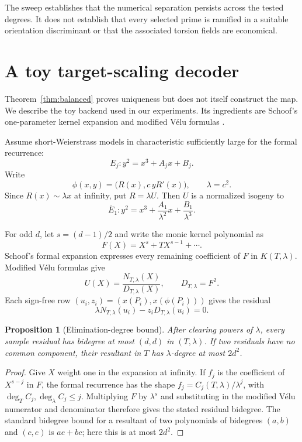 \documentclass[11pt]{article}
\newtheorem{proposition}[theorem]{Proposition}
\begin{document}
The sweep establishes that the numerical separation persists across the
tested degrees.  It does not establish that every selected prime is ramified
in a suitable orientation discriminant or that the associated torsion fields
are economical.

\section{A toy target-scaling decoder}

Theorem~\ref{thm:balanced} proves uniqueness but does not itself construct the
map.  We describe the toy backend used in our experiments.  Its ingredients
are Schoof's one-parameter kernel expansion and modified V\'elu formulas
\cite{schoof-counting,bmss,takahashi-kernel,velu}.

Assume short-Weierstrass models in characteristic sufficiently large for the
formal recurrence:
\[
 E_j:y^2=x^3+A_jx+B_j.
\]
Write
\[
 \phi(x,y)=\bigl(R(x),c\,yR'(x)\bigr),\qquad \lambda=c^2.
\]
Since $R(x)\sim\lambda x$ at infinity, put $R=\lambda U$.  Then $U$ is a
normalized isogeny to
\[
 \overline E_1:y^2=x^3+\frac{A_1}{\lambda^2}x
                         +\frac{B_1}{\lambda^3}.
\]

For odd $d$, let $s=(d-1)/2$ and write the monic kernel polynomial as
\[
 F(X)=X^s+T X^{s-1}+\cdots.
\]
Schoof's formal expansion expresses every remaining coefficient of $F$ in
$K(T,\lambda)$.  Modified V\'elu formulas give
\begin{equation}\label{eq:velu-x}
 U(X)=\frac{N_{T,\lambda}(X)}{D_{T,\lambda}(X)},
 \qquad D_{T,\lambda}=F^2.
\end{equation}
Each sign-free row $(u_i,z_i)=(x(P_i),x(\phi(P_i)))$ gives the residual
\begin{equation}\label{eq:sample-residual}
 \lambda N_{T,\lambda}(u_i)-z_iD_{T,\lambda}(u_i)=0.
\end{equation}

\begin{proposition}[Elimination-degree bound]\label{prop:elimination}
After clearing powers of $\lambda$, every sample residual has bidegree at most
$(d,d)$ in $(T,\lambda)$.  If two residuals have no common component, their
resultant in $T$ has $\lambda$-degree at most $2d^2$.
\end{proposition}

\begin{proof}
Give $X$ weight one in the expansion at infinity.  If $f_j$ is the coefficient
of $X^{s-j}$ in $F$, the formal recurrence has the shape
$f_j=C_j(T,\lambda)/\lambda^j$, with
$\deg_T C_j,\deg_\lambda C_j\le j$.  Multiplying $F$ by $\lambda^s$ and
substituting in the modified V\'elu numerator and denominator therefore gives
the stated residual bidegree.  The standard bidegree bound for a resultant of
two polynomials of bidegrees $(a,b)$ and $(c,e)$ is $ae+bc$; here this is at
most $2d^2$.
\end{proof}
\end{document}
